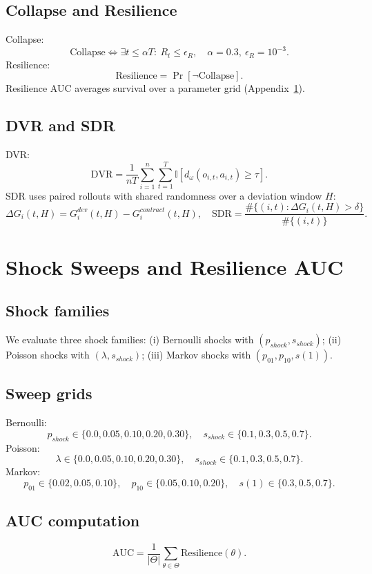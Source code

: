 \documentclass{article}
\theoremstyle{definition}
\theoremstyle{plain}
\theoremstyle{remark}
\newcommand{\ind}{\mathbb{I}}
\begin{document}
\subsection{Collapse and Resilience}
Collapse:
\[
\text{Collapse} \iff \exists t \le \alpha T:\ R_t \le \epsilon_R,
\quad \alpha=0.3,\ \epsilon_R=10^{-3}.
\]
Resilience:
\[
\mathrm{Resilience}=\Pr[\neg \text{Collapse}].
\]
Resilience AUC averages survival over a parameter grid (Appendix~\ref{app:shock}).

\subsection{DVR and SDR}
DVR:
\[
\mathrm{DVR}=\frac{1}{nT}\sum_{i=1}^n\sum_{t=1}^T \ind[d_\omega(o_{i,t},a_{i,t})\ge \tau].
\]
SDR uses paired rollouts with shared randomness over a deviation window $H$:
\[
\Delta G_i(t,H)=G_i^{dev}(t,H)-G_i^{contract}(t,H),
\quad \mathrm{SDR}=\frac{\#\{(i,t):\Delta G_i(t,H)>\delta\}}{\#\{(i,t)\}}.
\]

\section{Shock Sweeps and Resilience AUC}
\label{app:shock}

\subsection{Shock families}
We evaluate three shock families:
(i) Bernoulli shocks with $(p_{shock}, s_{shock})$;
(ii) Poisson shocks with $(\lambda, s_{shock})$;
(iii) Markov shocks with $(p_{01}, p_{10}, s(1))$.

\subsection{Sweep grids}
Bernoulli:
\[
p_{shock}\in\{0.0,0.05,0.10,0.20,0.30\},\quad
s_{shock}\in\{0.1,0.3,0.5,0.7\}.
\]
Poisson:
\[
\lambda\in\{0.0,0.05,0.10,0.20,0.30\},\quad
s_{shock}\in\{0.1,0.3,0.5,0.7\}.
\]
Markov:
\[
p_{01}\in\{0.02,0.05,0.10\},\quad
p_{10}\in\{0.05,0.10,0.20\},\quad
s(1)\in\{0.3,0.5,0.7\}.
\]

\subsection{AUC computation}
\[
\mathrm{AUC}=\frac{1}{|\Theta|}\sum_{\theta\in\Theta}\mathrm{Resilience}(\theta).
\]
\end{document}
